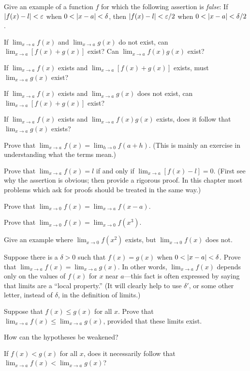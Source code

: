 Give an example of a function $f$ for which the following assertion is
\emph{false}: If $\lvert f(x)-l\rvert<\varepsilon$ when $0<\lvert x-a\rvert<\delta$, then
$\lvert f(x)-l\rvert<\varepsilon/2$ when $0<\lvert x-a\rvert<\delta/2$.

\begin{letters}
\item If $\lim_{x\to a}f(x)$ and $\lim_{x\to a}g(x)$ do not exist, can
$\lim_{x\to a}[f(x)+g(x)]$ exist? Can $\lim_{x\to a}f(x)g(x)$ exist?
\item If $\lim_{x\to a}f(x)$ exists and $\lim_{x\to a}[f(x)+g(x)]$ exists,
must $\lim_{x\to a}g(x)$ exist?
\item If $\lim_{x\to a}f(x)$ exists and $\lim_{x\to a}g(x)$ does not exist,
can $\lim_{x\to a}[f(x)+g(x)]$ exist?
\item If $\lim_{x\to a}f(x)$ exists and $\lim_{x\to a}f(x)g(x)$ exists, does
it follow that $\lim_{x\to a}g(x)$ exists?
\end{letters}

Prove that $\lim_{x\to a}f(x)=\lim_{h\to 0}f(a+h)$. (This is mainly an
exercise in understanding what the terms mean.)

\begin{letters}
\item Prove that $\lim_{x\to a}f(x)=l$ if and only if
$\lim_{x\to a}[f(x)-l]=0$. (First see why the assertion is obvious; then
provide a rigorous proof. In this chapter most problems which ask for proofs
should be treated in the same way.)
\item Prove that $\lim_{x\to 0}f(x)=\lim_{x\to a}f(x-a)$.
\item Prove that $\lim_{x\to 0}f(x)=\lim_{x\to 0}f(x^3)$.
\item Give an example where $\lim_{x\to 0}f(x^2)$ exists, but
$\lim_{x\to 0}f(x)$ does not.
\end{letters}

Suppose there is a $\delta>0$ such that $f(x)=g(x)$ when
$0<\lvert x-a\rvert<\delta$. Prove that $\lim_{x\to a}f(x)=\lim_{x\to a}g(x)$. In
other words, $\lim_{x\to a}f(x)$ depends only on the values of $f(x)$ for $x$
near $a$---this fact is often expressed by saying that limits are a ``local
property.'' (It will clearly help to use $\delta'$, or some other letter,
instead of $\delta$, in the definition of limits.)

\begin{letters}
\item Suppose that $f(x)\leq g(x)$ for all $x$. Prove that
$\lim_{x\to a}f(x)\leq\lim_{x\to a}g(x)$, provided that these limits exist.
\item How can the hypotheses be weakened?
\item If $f(x)<g(x)$ for all $x$, does it necessarily follow that
$\lim_{x\to a}f(x)<\lim_{x\to a}g(x)$?
\end{letters}

